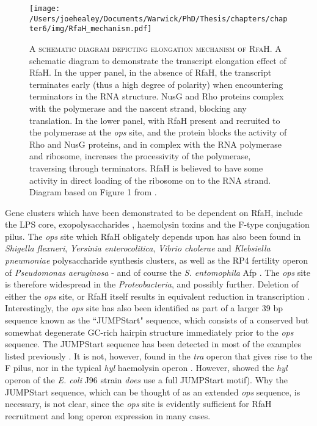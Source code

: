\begin{figure}[h]
    \texttt{[image: /Users/joehealey/Documents/Warwick/PhD/Thesis/chapters/chapter6/img/RfaH\_mechanism.pdf]}
    \captionsetup{singlelinecheck=off, justification=justified, font=footnotesize, aboveskip=0pt}
    \caption[Schematic diagram of the mechanism of RfaH-mediated transcript elongation]{\textsc{\normalsize A schematic diagram depicting elongation mechanism of RfaH.} \vspace{0.1cm} \newline A schematic diagram to demonstrate the transcript elongation effect of RfaH. In the upper panel, in the absence of RfaH, the transcript terminates early (thus a high degree of polarity) when encountering terminators in the RNA structure. NusG and Rho proteins complex with the polymerase and the nascent strand, blocking any translation. In the lower panel, with RfaH present and recruited to the polymerase at the \emph{ops} site, and the protein blocks the activity of Rho and NusG proteins, and in complex with the RNA polymerase and ribosome, increases the processivity of the polymerase, traversing through terminators. RfaH is believed to have some activity in direct loading of the ribosome on to the RNA strand. Diagram based on Figure 1 from \cite{Hu2017}. }
\label{rfahmechanism}
\end{figure}


Gene clusters which have been demonstrated to be dependent on RfaH, include the LPS core, exopolysaccharides \citep{Wilkinson1972}, haemolysin toxins \citep{Landraud2003, Leeds1996, Leeds1997} and the F-type conjugation pilus. The \emph{ops} site which RfaH obligately depends upon has also been found in \emph{Shigella flexneri}, \emph{Yersinia enterocolitica}, \emph{Vibrio cholerae} and \emph{Klebsiella pneumoniae} polysaccharide synthesis clusters, as well as the RP4 fertility operon of \emph{Pseudomonas aeruginosa} \citep{Bailey1997} - and of course the \emph{S. entomophila} Afp \citep{Hurst2007a}. The \emph{ops} site is therefore widespread in the \emph{Proteobacteria}, and possibly further. Deletion of either the \emph{ops} site, or RfaH itself results in equivalent reduction in transcription \citep{Bailey1997}. Interestingly, the \emph{ops} site has also been identified as part of a larger 39 bp sequence known as the ``JUMPStart" sequence, which consists of a conserved but somewhat degenerate GC-rich hairpin structure immediately prior to the \emph{ops} sequence. The JUMPStart sequence has been detected in most of the examples listed previously \citep{Wang1998}. It is not, however, found in the \emph{tra} operon that gives rise to the F pilus, nor in the typical \emph{hyl} haemolysin operon \citep{Nieto1996}. However, \cite{Leeds1997} showed the \emph{hyl} operon of the \emph{E. coli} J96 strain \emph{does} use a full JUMPStart motif). Why the JUMPStart sequence, which can be thought of as an extended \emph{ops} sequence, is necessary, is not clear, since the \emph{ops} site is evidently sufficient for RfaH recruitment and long operon expression in many cases.

